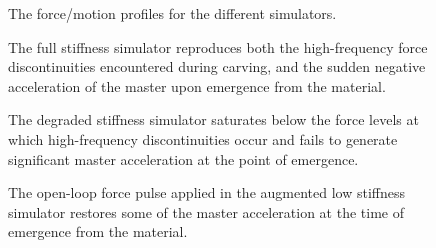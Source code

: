 \begin{figure}[p]
{{  The force/motion profiles for the different simulators.

  \vspace{\baselineskip}%

   The full stiffness simulator reproduces both the high-frequency force discontinuities encountered during carving, and the sudden negative acceleration of the master upon emergence from the material.

  \vspace{\baselineskip}%

   The degraded stiffness simulator saturates below the force levels at which high-frequency discontinuities occur and fails to generate significant master acceleration at the point of emergence.

  \vspace{\baselineskip}%

   The open-loop force pulse applied in the augmented low stiffness simulator restores some of the master acceleration at the time of emergence from the material.}%
\label{fig:profiles}%
}%
\end{figure}%